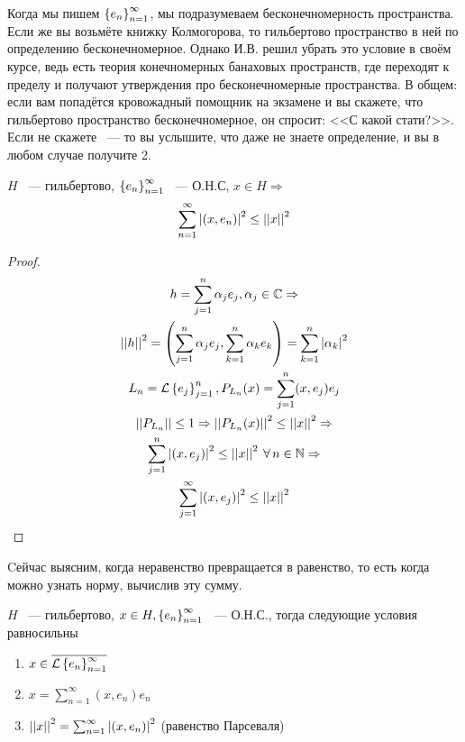 \documentclass[document]{subfiles}
\begin{document}
Когда мы пишем $\left\{e_n\right\}^\infty_{n=1}$, мы подразумеваем бесконечномерность пространства. Если же вы возьмёте книжку Колмогорова, то гильбертово пространство в ней по определению бесконечномерное. Однако И.В. решил убрать это условие в своём курсе,
ведь есть теория конечномерных банаховых пространств, где переходят к пределу
и получают утверждения про бесконечномерные пространства. В общем: если вам попадётся кровожадный помощник на экзамене и вы скажете, что гильбертово пространство бесконечномерное, он спросит: <<С какой стати?>>. Если не скажете ~--- то вы услышите, что даже не знаете определение,
и вы в любом случае получите 2.
\begin{corollary}
    $H$ ~--- гильбертово, $\left\{e_n\right\}^\infty_{n=1}$ ~--- О.Н.С, $x \in H \Rightarrow$
    \[ \sum^\infty_{n=1} \left| {(x,e_n)} \right|^2 \leq \left|\left| {x} \right| \right|^2 \] 
\end{corollary}
\begin{proof}
    \begin{gather*}
        h = \sum^n_{j=1} \alpha_j e_j, \alpha_j \in \bC \Rightarrow \\
        \norm{h}^2 = \left( \sum^n_{j=1} \alpha_j e_j, \sum^n_{k=1} \alpha_k e_k \right) = \sum^n_{k=1} \abs{\alpha_k}^2 \\
        L_n = \calL \seq{e_j}^n_{j=1}, P_{L_n}(x) = \sum^n_{j=1} (x, e_j) e_j \\
        \norm{P_{L_n}} \leq 1 \Rightarrow \norm{P_{L_n}(x)}^2 \leq \norm{x}^2 \Rightarrow \\
        \sum^n_{j=1} \abs{(x,e_j)}^2 \leq \norm{x}^2 \: \forall n \in \bN \Rightarrow \\
        \sum^\infty_{j=1} \abs{(x,e_j)}^2 \leq \norm{x}^2
    \end{gather*}
\end{proof}

Cейчас выясним, когда неравенство превращается в равенство, то есть когда можно узнать норму, вычислив эту сумму.


\begin{theorem}
    $H$ ~--- гильбертово, $x \in H, \left\{e_n\right\}^\infty_{n=1}$ ~--- О.Н.С., тогда следующие условия равносильны
    \begin{enumerate}
        \item $x \in \overline{\mathcal{L} \left\{e_n\right\}^\infty_{n=1}} $
        \item $x = \sum^\infty_{n=1} (x,e_n) e_n $
        \item $\left|\left| {x} \right| \right|^2 = \sum^\infty_{n=1} \left| {(x,e_n)} \right|^2$ (равенство Парсеваля)
    \end{enumerate}
\end{theorem}
\end{document}
